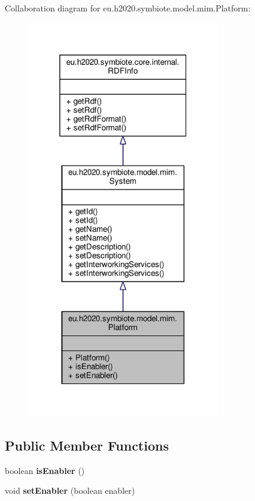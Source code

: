 Collaboration diagram for eu.\+h2020.\+symbiote.\+model.\+mim.\+Platform\+:\nopagebreak
\begin{figure}[H]
\begin{center}
\leavevmode
\includegraphics[width=236pt]{classeu_1_1h2020_1_1symbiote_1_1model_1_1mim_1_1Platform__coll__graph}
\end{center}
\end{figure}
\subsection*{Public Member Functions}
\begin{DoxyCompactItemize}
\item 
\mbox{\label{classeu_1_1h2020_1_1symbiote_1_1model_1_1mim_1_1Platform_a6b05570638b9493352633a5a079c45ed}} 
boolean {\bfseries is\+Enabler} ()
\item 
\mbox{\label{classeu_1_1h2020_1_1symbiote_1_1model_1_1mim_1_1Platform_ac0c3c12bef4bf1a820d48b1a224cec34}} 
void {\bfseries set\+Enabler} (boolean enabler)
\end{DoxyCompactItemize}


